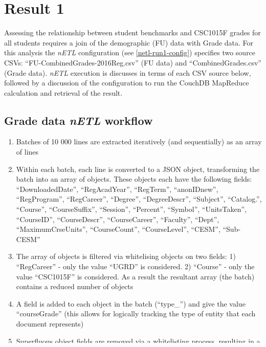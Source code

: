 \section{Result 1}
Assessing the relationship between student benchmarks and CSC1015F grades for all students requires a join of the demographic (FU) data with Grade data. For this analysis the \textit{nETL} configuration (see \ref{netl-run1-config}) specifies two source CSVs: ``FU-CombinedGrades-2016Reg.csv'' (FU data) and ``CombinedGrades.csv'' (Grade data). \textit{nETL} execution is discusses in terms of each CSV source below, followed by a discussion of the configuration to run the CouchDB MapReduce calculation and retrieval of the result.

\subsection*{Grade data \textit{nETL} workflow}
\begin{enumerate}
    \item Batches of 10 000 lines are extracted iteratively (and sequentially) as an array of lines
    \item Within each batch, each line is converted to a JSON object, transforming the batch into an array of objects. These objects each have the following fields: ``DownloadedDate'', ``RegAcadYear'', ``RegTerm'', ``anonIDnew'', ``RegProgram'', ``RegCareer'', ``Degree'', ``DegreeDescr'', ``Subject'', ``Catalog.'', ``Course'', ``CourseSuffix'', ``Session'', ``Percent'', ``Symbol'', ``UnitsTaken'', ``CourseID'', ``CourseDescr'', ``CourseCareer'', ``Faculty'', ``Dept'', ``MaximumCrseUnits'', ``CourseCount'', ``CourseLevel'', ``CESM'', ``Sub-CESM''
    \item The array of objects is filtered via whitelising objects on two fields: 1) ``RegCareer'' - only the value ``UGRD'' is considered. 2) ``Course'' - only the value ``CSC1015F'' is considered. As a result the resultant array (the batch) contains a reduced number of objects
    \item A field is added to each object in the batch (``type\_'') and give the value ``courseGrade'' (this allows for logically tracking the type of entity that each document represents)
    \item Superfluous object fields are removed via a whitelisting process, resulting in a batch (an array) of objects with the fields: ``type\_'', ``Course'', ``RegAcadYear'', ``anonIDnew'', ``Percent''
    \item Each batch is loaded into CouchDB using the \textit{\_bulk\_docs} endpoint (as discussed previously), and the next batch is extracted on a success message from CouchDB
\end{enumerate}

